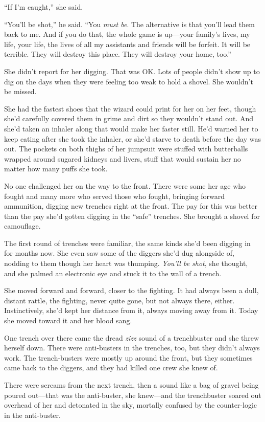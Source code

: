 “If I’m caught,” she said.

“You’ll be shot,” he said. “You \emph{must be}. The alternative is
that you’ll lead them back to me. And if you do that, the whole
game is up—your family’s lives, my life, your life, the lives of
all my assistants and friends will be forfeit. It will be terrible.
They will destroy this place. They will destroy your home, too.”

She didn’t report for her digging. That was OK. Lots of people
didn’t show up to dig on the days when they were feeling too weak
to hold a shovel. She wouldn’t be missed.

She had the fastest shoes that the wizard could print for her on
her feet, though she’d carefully covered them in grime and dirt so
they wouldn’t stand out. And she’d taken an inhaler along that
would make her faster still. He’d warned her to keep eating after
she took the inhaler, or she’d starve to death before the day was
out. The pockets on both thighs of her jumpsuit were stuffed with
butterballs wrapped around sugared kidneys and livers, stuff that
would sustain her no matter how many puffs she took.

No one challenged her on the way to the front. There were some her
age who fought and many more who served those who fought, bringing
forward ammunition, digging new trenches right at the front. The
pay for this was better than the pay she’d gotten digging in the
“safe” trenches. She brought a shovel for camouflage.

The first round of trenches were familiar, the same kinds she’d
been digging in for months now. She even saw some of the diggers
she’d dug alongside of, nodding to them though her heart was
thumping. \emph{You’ll be shot}, she thought, and she palmed an
electronic eye and stuck it to the wall of a trench.

She moved forward and forward, closer to the fighting. It had
always been a dull, distant rattle, the fighting, never quite gone,
but not always there, either. Instinctively, she’d kept her
distance from it, always moving away from it. Today she moved
toward it and her blood sang.

One trench over there came the dread \emph{zizz} sound of a
trenchbuster and she threw herself down. There were anti-busters in
the trenches, too, but they didn’t always work. The trench-busters
were mostly up around the front, but they sometimes came back to
the diggers, and they had killed one crew she knew of.

There were screams from the next trench, then a sound like a bag of
gravel being poured out—that was the anti-buster, she knew—and the
trenchbuster soared out overhead of her and detonated in the sky,
mortally confused by the counter-logic in the anti-buster.

